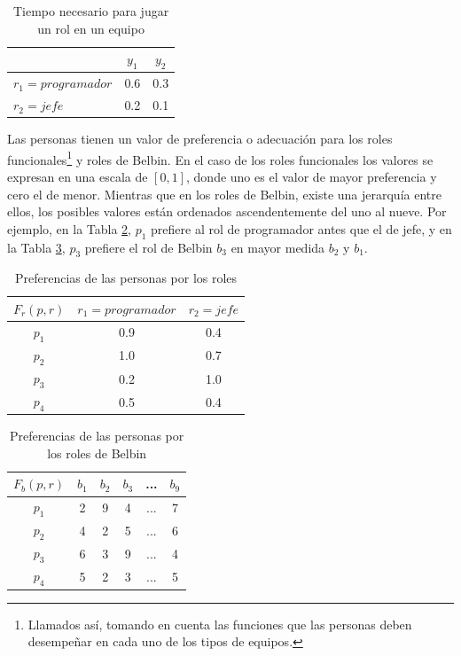 \begin{table}[H]
  \centering
  \caption{Tiempo necesario para jugar un rol en un equipo}\label{tr-sof}
\begin{tabular}{|l|c|c|}
	\hline
	\thead{$T(r,y)$}  & $y_1$ & $y_2$ \\ \hline
	$r_1=programador$ &  0.6  &  0.3  \\ \hline
	$r_2=jefe$        &  0.2  &  0.1  \\ \hline
\end{tabular}
\end{table}


Las personas tienen un valor de preferencia o adecuación para los roles funcionales\footnote{Llamados así, tomando en cuenta las funciones que las personas deben desempeñar en cada uno de los tipos de equipos.} y roles de Belbin. En el caso de los roles funcionales los valores se expresan en una escala de $[0, 1]$, donde uno es el valor de mayor preferencia y cero el de menor. Mientras que en los roles de Belbin, existe una jerarquía entre ellos, los posibles valores están ordenados ascendentemente del uno al nueve. Por ejemplo, en la Tabla \ref{pr-sof}, $p_1$ prefiere al rol de programador antes que el de jefe, y en la Tabla \ref{prb-sof}, $p_3$ prefiere el rol de Belbin $b_3$ en mayor medida $b_2$ y $b_1$.

\begin{table}[H]
  \centering
  \caption{Preferencias de las personas por los roles}\label{pr-sof}
\begin{tabular}{|c|c|c|}
	\hline
	$F_r(p,r)$ & $r_1=programador$ & $r_2=jefe$ \\ \hline
	  $p_1$    &        0.9        &    0.4     \\ \hline
	  $p_2$    &        1.0        &    0.7     \\ \hline
	  $p_3$    &        0.2        &    1.0     \\ \hline
	  $p_4$    &        0.5        &    0.4     \\ \hline
\end{tabular}
\end{table}

\begin{table}[H]
  \centering
  \caption{Preferencias de las personas por los roles de Belbin}\label{prb-sof}
\begin{tabular}{|c|c|c|c|c|c|}
	\hline
	$F_b(p,r)$ & $b_1$ & $b_2$ & $b_3$ & ... & $b_9$ \\ \hline
	  $p_1$    &   2   &   9   &   4   & ... &   7   \\ \hline
	  $p_2$    &   4   &   2   &   5   & ... &   6   \\ \hline
	  $p_3$    &   6   &   3   &   9   & ... &   4   \\ \hline
	  $p_4$    &   5   &   2   &   3   & ... &   5   \\ \hline
\end{tabular}
\end{table}



